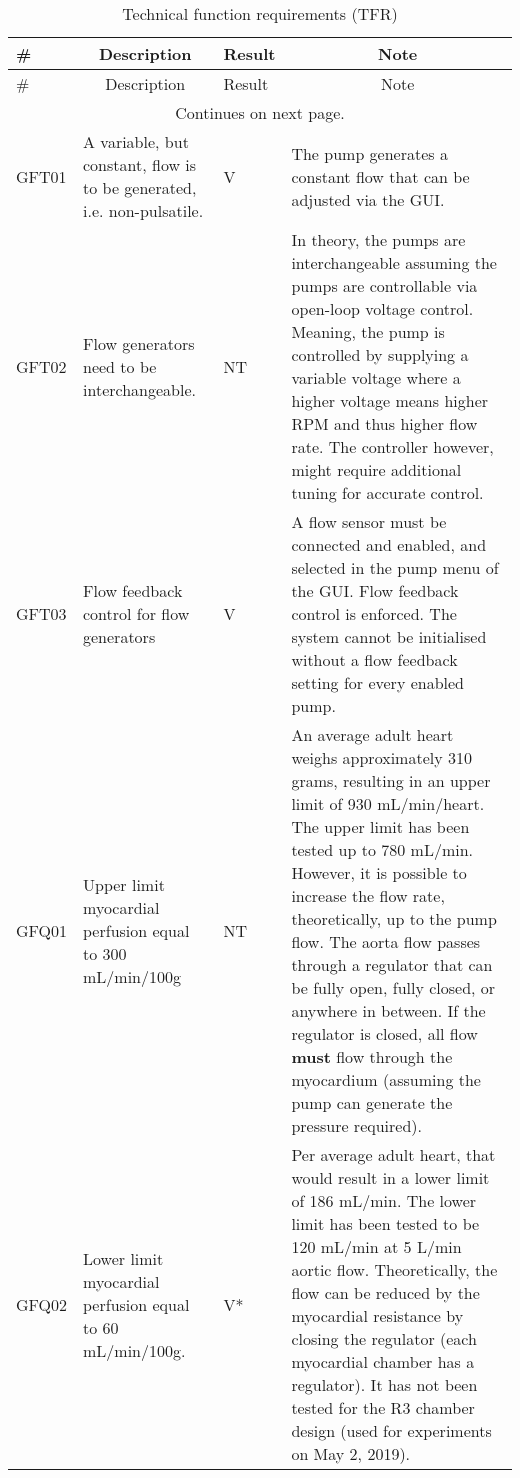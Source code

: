 		\begin{longtable}{m{1.5cm}|m{5.25cm}>{\centering\arraybackslash}m{1cm}m{5.75cm}|}
		\caption{Technical function requirements (TFR)}
		\label{tab:tfr_requirements} \\
		\# & \multicolumn{1}{c}{Description} & Result & \multicolumn{1}{c}{Note} \\ \hline 
		\endfirsthead
		
		\# & \multicolumn{1}{c}{Description} & Result & \multicolumn{1}{c}{Note} \\ \hline 
		\endhead
		
		\cline{2-4} \multicolumn{4}{c}{Continues on next page.} \\
		\endfoot
		
		\cline{2-4}
		\endlastfoot
		
		GFT01 	& A variable, but constant, flow is to be generated, i.e. non-pulsatile. & \cellcolor{green!50}V & The pump generates a constant flow that can be adjusted via the GUI. \\
		GFT02 	& Flow generators need to be interchangeable. & \cellcolor{blue!50}NT & In theory, the pumps are interchangeable assuming the pumps are controllable via open-loop voltage control. Meaning, the pump is controlled by supplying a variable voltage where a higher voltage means higher RPM and thus higher flow rate. The controller however, might require additional tuning for accurate control. \\
		GFT03	& Flow feedback control for flow generators	& \cellcolor{green!50}V & A flow sensor must be connected and enabled, and selected in the pump menu of the GUI. Flow feedback control is enforced. The system cannot be initialised without a flow feedback setting for every enabled pump. \\ 		
		GFQ01	& Upper limit myocardial perfusion equal to 300 mL/min/100g & \cellcolor{blue!50}NT & An average adult heart weighs approximately 310 grams, resulting in an upper limit of 930 mL/min/heart. The upper limit has been tested up to 780 mL/min. However, it is possible to increase the flow rate, theoretically, up to the pump flow. The aorta flow passes through a regulator that can be fully open, fully closed, or anywhere in between. If the regulator is closed, all flow \textbf{must} flow through the myocardium (assuming the pump can generate the pressure required). \\
		GFQ02	& Lower limit myocardial perfusion equal to 60 mL/min/100g. & \cellcolor{yellow!50}V* & Per average adult heart, that would result in a lower limit of 186 mL/min. The lower limit has been tested to be 120 mL/min at 5 L/min aortic flow. Theoretically, the flow can be reduced by the myocardial resistance by closing the regulator (each myocardial chamber has a regulator). It has not been tested for the R3 chamber design (used for experiments on May 2, 2019).\\

\end{longtable}
